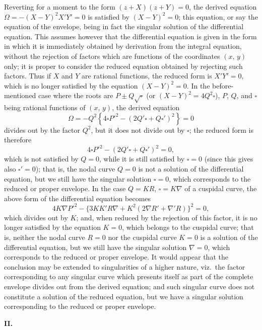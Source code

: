 \documentclass[11pt,a4paper]{article}
\theoremstyle{plain}
\begin{document}
Reverting for a moment to the form $(z + X)(z + Y) = 0$, the derived equation $\Omega = -(X - Y)^2 X' Y' = 0$ is satisfied by $(X - Y)^2 = 0$; this equation, or say the equation of the envelope, being in fact the singular solution of the differential equation. This assumes however that the differential equation is given in the form in which it is immediately obtained by derivation from the integral equation, without the rejection of factors which are functions of the coordinates $(x,\,y)$ only; it is proper to consider the reduced equation obtained by rejecting such factors. Thus if $X$ and $Y$ are rational functions, the reduced form is $X' Y' = 0$, which is no longer satisfied by the equation
\newpage
$(X - Y)^2 = 0$. In the before-mentioned case where the roots are $P \pm Q\sqrt{\square}$ (or $(X - Y)^2 = 4 Q^2 \square$), $P$, $Q$, and $\square$ being rational functions of $(x,\,y)$, the derived equation
\[
\Omega = -Q^2\!\left\{4\square P'^2 - (2 Q'\square + Q\square')^2\right\} = 0
\]
divides out by the factor $Q^2$, but it does not divide out by $\square$; the reduced form is therefore
\[
4 \square P'^2 - (2 Q'\square + Q\square')^2 = 0,
\]
which is not satisfied by $Q = 0$, while it is still satisfied by $\square = 0$ (since this gives also $\square' = 0$); that is, the nodal curve $Q = 0$ is not a solution of the differential equation, but we still have the singular solution $\square = 0$, which corresponds to the reduced or proper envelope. In the case $Q = K R$, $\square = K \nabla$ of a cuspidal curve, the above form of the differential equation becomes
\[
4 K \nabla P'^2 - \{3 K K' R \nabla + K^2 (2 \nabla R' + \nabla' R)\}^2 = 0,
\]
which divides out by $K$; and, when reduced by the rejection of this factor, it is no longer satisfied by the equation $K = 0$, which belongs to the cuspidal curve; that is, neither the nodal curve $R = 0$ nor the cuspidal curve $K = 0$ is a solution of the differential equation, but we still have the singular solution $\nabla = 0$, which corresponds to the reduced or proper envelope. It would appear that the conclusion may be extended to singularities of a higher nature, viz.\ the factor corresponding to any singular curve which presents itself as part of the complete envelope divides out from the derived equation; and such singular curve does not constitute a solution of the reduced equation, but we have a singular solution corresponding to the reduced or proper envelope.

\begin{center}\textbf{II.}\end{center}
\end{document}
